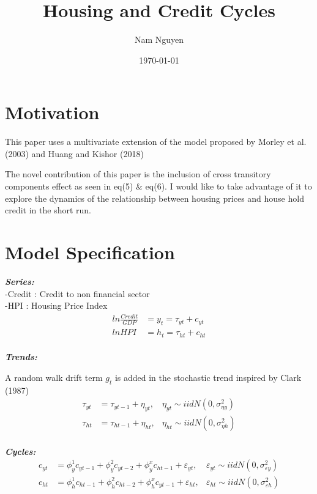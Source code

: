 \documentclass[fleqn]{article}
\title{Housing and Credit Cycles}
\author{Nam Nguyen}
\date{\today}
\begin{document}
	\maketitle
	
\begin{outline}[enumerate]

\section{Motivation}

This paper uses a multivariate extension of the model proposed by Morley et al. (2003) and Huang and Kishor (2018)

The novel contribution of this paper is the inclusion of cross transitory components effect as seen in eq(5) \& eq(6). I would like to take advantage of it to explore the dynamics of the relationship between housing prices and house hold credit in the short run.
		
\section {Model Specification}

\textbf{\textit{Series:}} \\
-Credit : Credit to non financial sector\\
-HPI : Housing Price Index
	\begin{align}
	ln \frac{Credit}{GDP} &= y_t = \tau_{yt} + c_{yt}
	\\
	ln HPI &= h_t = \tau_{ht} + c_{ht}
	\end{align}
	\\
\textbf{\textit{Trends:}}

A random walk drift term $g_t$ is added in the stochastic trend inspired by Clark (1987)
	\begin{align}
	\tau_{yt} &= \tau_{yt-1} + \eta_{yt}, &\eta_{yt} \sim iidN(0,\sigma^2_{\eta y})
	\\
	\tau_{ht} &= \tau_{ht-1} + \eta_{ht}, &\eta_{ht} \sim iidN(0,\sigma^2_{\eta h})	
	\end{align}
	\\
\textbf{\textit{Cycles:}}
	\begin{align}
	c_{yt} &= \phi^1_{y}c_{yt-1}  
		   + \phi^2_{y}c_{yt-2}  
		   + \phi^x_{y}c_{ht-1} 
		   + \varepsilon_{yt},
		   &\varepsilon_{yt} \sim iidN(0,\sigma^2_{\varepsilon y})		   
	\\
	c_{ht} &= \phi^1_{h}c_{ht-1}  
		   + \phi^2_{h}c_{ht-2}
		   + \phi^x_{h}c_{yt-1}  
	   	   + \varepsilon_{ht},
	   	   	&\varepsilon_{ht} \sim iidN(0,\sigma^2_{\varepsilon h})
	\end{align}
	\\



\end{outline}
\end{document}
